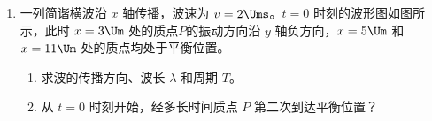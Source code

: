 \begin{enumerate}
\begin{enumerate}
	\item
	该同学根据测出的多组 $ a $、$ n $ 值，作出 $ a-n $ 图像。若该图像近似是一条通过原点的直线，则可以验证：质量一定时，物体的加速度与所受合外力成。
	
	\item
	若 $ a-n $ 图像明显不过原点，原因可能是（单选，填标号）。
	{步骤  中导轨的倾斜程度调节不恰当}
	{钩码质量没有远小于小车和遮光条的总质量}
	
\end{enumerate}



\item
一列简谐横波沿 $ x $ 轴传播，波速为 $ v =2 \Ums $。$ t =0 $ 时刻的波形图如图所示，此时 $ x =3\Um $ 处的质点$ P $的振动方向沿 $ y $ 轴负方向，$ x =5 \Um $ 和 $ x =11 \Um $ 处的质点均处于平衡位置。
\begin{enumerate}
	\item 
	求波的传播方向、波长 $ \lambda $ 和周期 $ T $。
	
	\item
	从 $ t =0 $ 时刻开始，经多长时间质点 $ P $ 第二次到达平衡位置？
\end{enumerate}
\begin{figure}[htbp]
	\raggedleft
	
\end{figure}


\end{enumerate}
